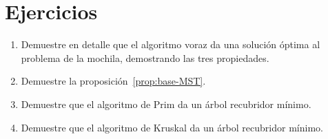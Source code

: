 \section*{Ejercicios}
\label{sec:ejercicios-08}

  \begin{enumerate}
  \item
    Demuestre en detalle que el algoritmo voraz
    da una solución óptima al problema de la mochila,
    demostrando las tres propiedades.
  \item
    Demuestre la proposición~\ref{prop:base-MST}.
  \item
    Demuestre que el algoritmo de Prim da un árbol recubridor mínimo.
  \item
    Demuestre que el algoritmo de Kruskal da un árbol recubridor mínimo.
  \end{enumerate}




